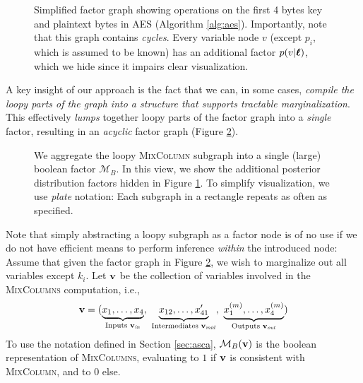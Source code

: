 \begin{figure}[ht]
    \centering
    
    \caption{Simplified factor graph showing operations on the first 4 bytes key and plaintext bytes in AES (Algorithm \ref{alg:aes}). Importantly, note that this graph contains \textit{cycles}. Every variable node $v$ (except $p_i$, which is assumed to be known) has an additional factor $p(v | \boldsymbol{\ell})$, which we hide since it impairs clear visualization.}
    \label{fig:aes_fg}
\end{figure}


A key insight of our approach is the fact that we can, in some cases, \textit{compile the loopy parts of the graph into a structure that supports tractable marginalization}. This effectively \textit{lumps} together loopy parts of the factor graph into a \textit{single} factor, resulting in an \textit{acyclic} factor graph (Figure \ref{fig:aes_acyclic_fg}).

\begin{figure}[h!]
    \centering
    
    \caption{We aggregate the loopy \textsc{MixColumn} subgraph into a single (large) boolean factor $\mathcal{M}_B$. In this view, we show the additional posterior distribution factors hidden in Figure \ref{fig:aes_fg}. To simplify visualization, we use \textit{plate} notation: Each subgraph in a rectangle repeats as often as specified.}
    \label{fig:aes_acyclic_fg}
\end{figure}

Note that simply abstracting a loopy subgraph as a factor node is of no use if we do not have efficient means to perform inference \textit{within} the introduced node: Assume that given the factor graph in Figure \ref{fig:aes_acyclic_fg}, we wish to marginalize out all variables except $k_i$. Let $\mathbf{v}$ be the collection of variables involved in the \textsc{MixColumns} computation, i.e.,
\begin{align}
    \vv = ( \underbrace{x_1,\dots,x_4}_{\text{Inputs } \vin}, \ \underbrace{x_{12},\dots,x'_{41}}_{\text{Intermediates } \vmid}, \ \underbrace{x_1^{(m)},\dots,x_4^{(m)}}_{\text{Outputs } \vout} )
\end{align}
To use the notation defined in Section \ref{sec:asca}, $\mathcal{M}_B(\mathbf{v})$ is the boolean representation of \textsc{MixColumns}, evaluating to $1$ if $\mathbf{v}$ is consistent with \textsc{MixColumn}, and to $0$ else.

